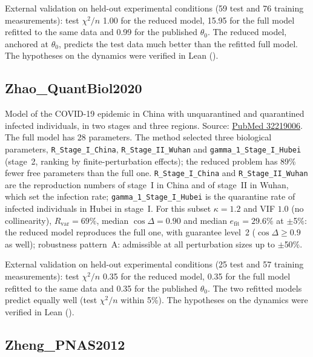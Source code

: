 External validation on held-out experimental conditions (59 test and 76 training measurements): test $\chi^2/n$ 1.00 for the reduced model, 15.95 for the full model refitted to the same data and 0.99 for the published $\theta_0$. The reduced model, anchored at $\theta_0$, predicts the test data much better than the refitted full model. The hypotheses on the dynamics were verified in Lean ().

\subsection*{Zhao\_QuantBiol2020}

Model of the COVID-19 epidemic in China with unquarantined and quarantined infected individuals, in two stages and three regions. Source: \href{https://pubmed.ncbi.nlm.nih.gov/32219006/}{PubMed 32219006}. The full model has 28 parameters. The method selected three biological parameters, \texttt{R\_Stage\_I\_China}, \texttt{R\_Stage\_II\_Wuhan} and \texttt{gamma\_1\_Stage\_I\_Hubei} (stage~2, ranking by finite-perturbation effects); the reduced problem has 89\% fewer free parameters than the full one. \texttt{R\_Stage\_I\_China} and \texttt{R\_Stage\_II\_Wuhan} are the reproduction numbers of stage~I in China and of stage~II in Wuhan, which set the infection rate; \texttt{gamma\_1\_Stage\_I\_Hubei} is the quarantine rate of infected individuals in Hubei in stage~I. For this subset $\kappa=1.2$ and VIF $1.0$ (no collinearity), $R_{\mathrm{var}}=69\%$, median $\cos\Delta=0.90$ and median $e_{\mathrm{fit}}=29.6\%$ at $\pm$5\%: the reduced model reproduces the full one, with guarantee level~2 ($\cos\Delta\ge0.9$ as well); robustness pattern~A: admissible at all perturbation sizes up to $\pm$50\%.

External validation on held-out experimental conditions (25 test and 57 training measurements): test $\chi^2/n$ 0.35 for the reduced model, 0.35 for the full model refitted to the same data and 0.35 for the published $\theta_0$. The two refitted models predict equally well (test $\chi^2/n$ within 5\%). The hypotheses on the dynamics were verified in Lean ().

\subsection*{Zheng\_PNAS2012}

